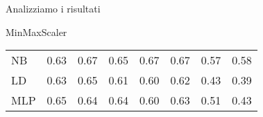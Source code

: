 \documentclass{beamer}
\begin{document}
\begin{frame}{Analizziamo i risultati}
\begin{block}{MinMaxScaler}
\begin{center}
\begin{adjustbox}{max width=\textwidth}
\begin{tabular}{lrrrrrrr}
					NB  &  0.63 &                  0.67 &                   0.65 &                   0.67 &                   0.67 &                    0.57 &                    0.58 \\
					LD  &  0.63 &                  0.65 &                   0.61 &                   0.60 &                   0.62 &                    0.43 &                    0.39 \\
					MLP &  0.65 &                  0.64 &                   0.64 &                   0.60 &                   0.63 &                    0.51 &                    0.43 \\
					\bottomrule
				\end{tabular}
			\end{adjustbox}
		\end{center}
	\end{block}
\end{frame}
\end{document}
